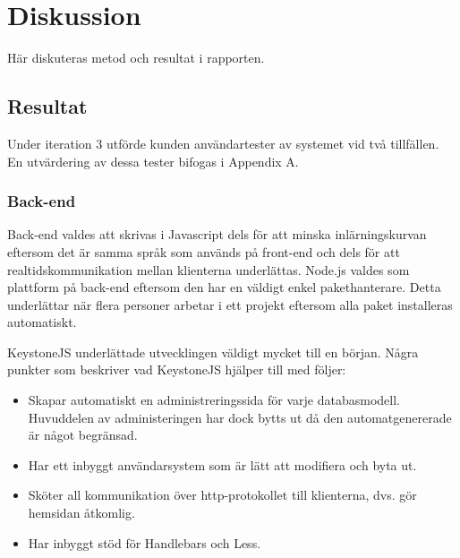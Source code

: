 \documentclass{article}
\begin{document}

\clearpage

\clearpage

\section{Diskussion}
Här diskuteras metod och resultat i rapporten.
\subsection{Resultat}
Under iteration 3 utförde kunden användartester av systemet vid två tillfällen. En utvärdering av dessa tester bifogas i Appendix A.

\subsubsection{Back-end}
Back-end valdes att skrivas i Javascript dels för att minska inlärningskurvan eftersom det är samma språk som används på front-end och dels för att realtidskommunikation mellan klienterna underlättas. Node.js valdes som plattform på back-end eftersom den har en väldigt enkel pakethanterare. Detta underlättar när flera personer arbetar i ett projekt eftersom alla paket installeras automatiskt.

KeystoneJS underlättade utvecklingen väldigt mycket till en början. Några punkter som beskriver vad KeystoneJS hjälper till med följer:

  \begin{itemize}
    \item Skapar automatiskt en administreringssida för varje databasmodell.
      Huvuddelen av administeringen har dock bytts ut då den automatgenererade är något begränsad.
    \item Har ett inbyggt användarsystem som är lätt att modifiera och byta ut.
    \item Sköter all kommunikation över http-protokollet till klienterna, dvs. gör hemsidan åtkomlig.
    \item Har inbyggt stöd för Handlebars och Less.
  \end{itemize}
  
\end{document}
